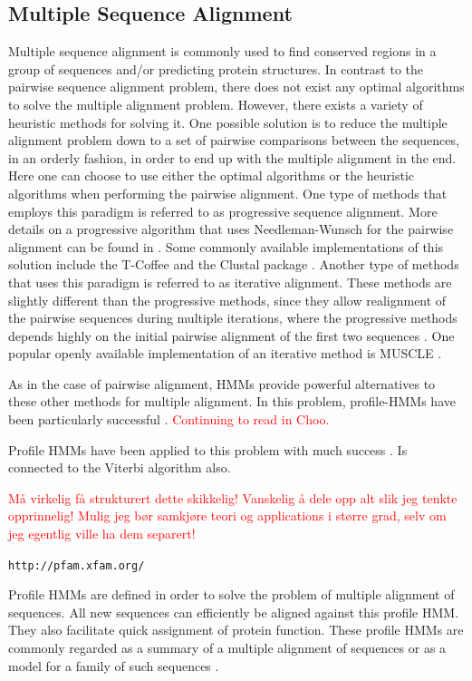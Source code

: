 \documentclass{article}
\begin{document}
\subsection{Multiple Sequence Alignment}
Multiple sequence alignment is commonly used to find conserved regions in a group of sequences and/or predicting protein structures. In contrast to the pairwise sequence alignment problem, there does not exist any optimal algorithms to solve the multiple alignment problem. However, there exists a variety of heuristic methods for solving it. One possible solution is to reduce the multiple alignment problem down to a set of pairwise comparisons between the sequences, in an orderly fashion, in order to end up with the multiple alignment in the end. Here one can choose to use either the optimal algorithms or the heuristic algorithms when performing the pairwise alignment. One type of methods that employs this paradigm is referred to as progressive sequence alignment. More details on a progressive algorithm that uses Needleman-Wunsch for the pairwise alignment can be found in \cite{Feng1987}. Some commonly available implementations of this solution include the T-Coffee and the Clustal package \cite{EMBL-EBI-Multiple}. Another type of methods that uses this paradigm is referred to as iterative alignment. These methods are slightly different than the progressive methods, since they allow realignment of the pairwise sequences during multiple iterations, where the progressive methods depends highly on the initial pairwise alignment of the first two sequences \cite{BioInfoOrgMSA}. One popular openly available implementation of an iterative method is MUSCLE \cite{EMBL-EBI-Multiple}. 

As in the case of pairwise alignment, HMMs provide powerful alternatives to these other methods for multiple alignment. In this problem, profile-HMMs have been particularly successful \cite{Choo2004}. \textcolor{red}{Continuing to read in Choo.}

Profile HMMs have been applied to this problem with much success . Is connected to the Viterbi algorithm also.   

\textcolor{red}{Må virkelig få strukturert dette skikkelig! Vanskelig å dele opp alt slik jeg tenkte opprinnelig! Mulig jeg bør samkjøre teori og applications i større grad, selv om jeg egentlig ville ha dem separert!}

\verb$http://pfam.xfam.org/$

Profile HMMs are defined in order to solve the problem of multiple alignment of sequences. All new sequences can efficiently be aligned against this profile HMM. They also facilitate quick assignment of protein function. These profile HMMs are commonly regarded as a summary of a multiple alignment of sequences or as a model for a family of such sequences \cite{Christianini2006}. 
\end{document}
